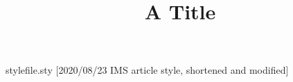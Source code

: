 \begin{filecontents*}{stylefile.sty}
[2020/08/23 IMS article style, shortened and modified]
\DeclareRobustCommand\ead[2][label= ,email]{}
\def\printead#1{(#1)}
\newenvironment{aug}{}{\par}
\def\and{\unskip~and~}
\def\author{\@ifnextchar[{\author@fmt}{\author@fmt[]}}
\def\author@fmt[#1]#2{\bgroup\def\fnms##1{##1}\def\snm##1{##1}\noindent#2\egroup}
\def\address{\@ifnextchar[{\address@fmt}{\address@fmt[]}}
\def\address@fmt[#1]#2{\par\noindent#2\par}
\def\affiliation#1{\par\noindent#1\par}
\end{filecontents*}
\documentclass{article}
\usepackage{stylefile}

\title{A Title}
\begin{aug}
\author[A]{ }
\and
\author[B]{ }
\address[A]{Univ A, }
\address[B]{Univ B, }
\end{aug}
Body.

